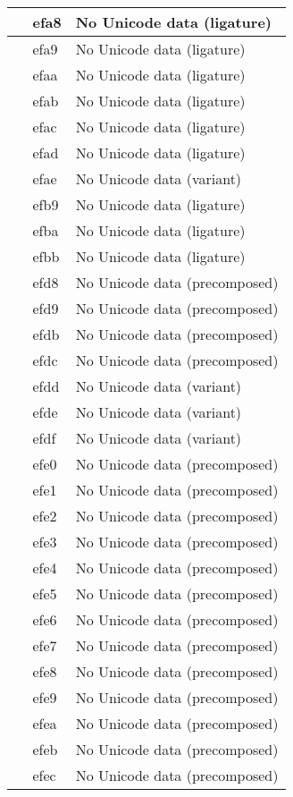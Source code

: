 \documentclass[12pt,letterpaper,openany]{book}
\begin{document}
\begin{center}
\begin{supertabular}{|m{0.25in}|m{0.5in}|m{4in}|}
 & efa8 & No Unicode data (ligature)\\\hline
 & efa9 & No Unicode data (ligature)\\\hline
 & efaa & No Unicode data (ligature)\\\hline
 & efab & No Unicode data (ligature)\\\hline
 & efac & No Unicode data (ligature)\\\hline
 & efad & No Unicode data (ligature)\\\hline
 & efae & No Unicode data (variant)\\\hline
 & efb9 & No Unicode data (ligature)\\\hline
 & efba & No Unicode data (ligature)\\\hline
 & efbb & No Unicode data (ligature)\\\hline
 & efd8 & No Unicode data (precomposed)\\\hline
 & efd9 & No Unicode data (precomposed)\\\hline
 & efdb & No Unicode data (precomposed)\\\hline
 & efdc & No Unicode data (precomposed)\\\hline
 & efdd & No Unicode data (variant)\\\hline
 & efde & No Unicode data (variant)\\\hline
 & efdf & No Unicode data (variant)\\\hline
 & efe0 & No Unicode data (precomposed)\\\hline
 & efe1 & No Unicode data (precomposed)\\\hline
 & efe2 & No Unicode data (precomposed)\\\hline
 & efe3 & No Unicode data (precomposed)\\\hline
 & efe4 & No Unicode data (precomposed)\\\hline
 & efe5 & No Unicode data (precomposed)\\\hline
 & efe6 & No Unicode data (precomposed)\\\hline
 & efe7 & No Unicode data (precomposed)\\\hline
 & efe8 & No Unicode data (precomposed)\\\hline
 & efe9 & No Unicode data (precomposed)\\\hline
 & efea & No Unicode data (precomposed)\\\hline
 & efeb & No Unicode data (precomposed)\\\hline
 & efec & No Unicode data (precomposed)\\\hline

\end{supertabular}
\end{center}
\end{document}
